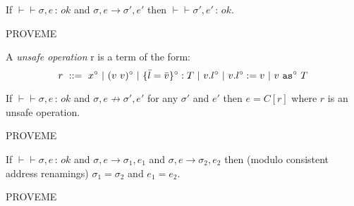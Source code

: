 \documentclass{article}
\newcommand{\unsafe}{\circ}
\newcommand{\app}[3]{(#2~#3)^{#1}}
\newcommand{\cast}[3]{#2~\t{as}^{#1}~#3}
\renewcommand{\t}[1]{{\tt #1}}
\newcommand{\red}[0]{\longrightarrow}  %
\newcommand{\lred}[0]{\red}  %
\newcommand{\judges}[3]{#1\vdash\!\!\!\vdash #2\,:\,#3}
\newcommand{\obje}[3]{\{#2\}^{#1}:{#3}}
\newcommand{\objget}[3]{#2.#3^{#1}}
\newcommand{\objset}[4]{#2.#3^{#1}:=#4}
\begin{document}
\begin{lemma}[Preservation]
If $\judges{}{\sigma,e}{ok}$ and $\sigma,e\lred \sigma',e'$ then $\judges{}{\sigma',e'}{ok}$.
\end{lemma}
PROVEME

A \emph{unsafe operation} r is a term of the form:
\[
	r ~::=~ x^\unsafe ~|~ \app{\unsafe}{v}{v} ~|~ \obje{\unsafe}{\bar l = \bar v}{T} ~|~ \objget{\unsafe}{v}{l} ~|~ \objset{\unsafe} v l v
	~|~ \cast{\unsafe} v T
\]
 
\begin{lemma}[Progress]
If $\judges{}{\sigma,e}{ok}$ and $\sigma,e\not\lred \sigma',e'$
for any $\sigma'$ and $e'$ then $e=C[r]$ where $r$ is an unsafe operation. 
\end{lemma}
PROVEME

\begin{lemma}[Determinism]
If $\judges{}{\sigma,e}{ok}$ and $\sigma,e\lred \sigma_1,e_1$ and $\sigma,e\lred \sigma_2,e_2$ then (modulo consistent address renamings) $\sigma_1=\sigma_2$ and $e_1=e_2$.
\end{lemma}
PROVEME
\end{document}
